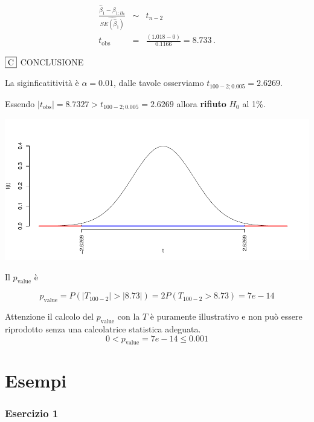 \documentclass[
  11pt,
]{book}
\theoremstyle{mytheoremstyle}
\theoremstyle{mydefstyle}
\begin{document}
\begin{eqnarray*}
 \frac{\hat\beta_{ 1 } - \beta_{ 1 ;H_0}} {\widehat{SE(\hat\beta_{ 1 })}}&\sim&t_{n-2}\\
   t_{\text{obs}}
&=& \frac{ ( 1.018 -  0 )} { 0.1166 }
 =   8.733 \, .
\end{eqnarray*}

\(\fbox{C}\) CONCLUSIONE

La siginficatitività è \(\alpha=0.01\), dalle tavole osserviamo \(t_{100-2;0.005}=2.6269\).

Essendo \(|t_\text{obs}|=8.7327>t_{100-2;0.005}=2.6269\) allora \textbf{rifiuto} \(H_0\) al 1\%.

\begin{center}\includegraphics{Appunti_di_Statistica_2025_files/figure-latex/25-test-functions-11-2} \end{center}

Il \(p_{\text{value}}\) è

\[ p_{\text{value}} = P(|T_{100-2}|>|8.73|)=2P(T_{100-2}>8.73)=7e-14 \]

Attenzione il calcolo del \(p_\text{value}\) con la \(T\) è puramente illustrativo e non può essere riprodotto senza una calcolatrice statistica adeguata.\[
 0 < p_\text{value}= 7e-14 \leq 0.001 
\]

\section{Esempi}\label{esempi-3}

\subsubsection{Esercizio 1}\label{esercizio-1}
\end{document}
